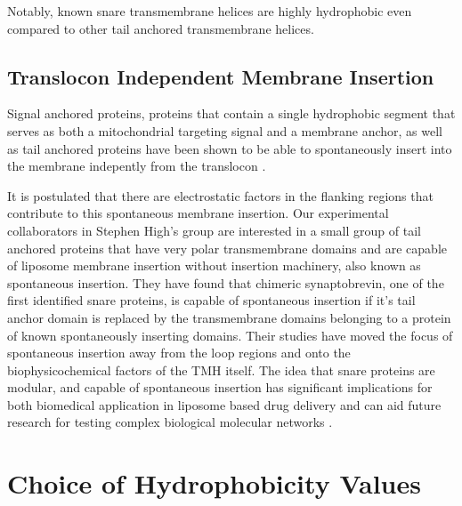Notably, known \gls{snare} transmembrane helices are highly hydrophobic even compared to other tail anchored transmembrane helices.

\subsection{Translocon Independent Membrane Insertion}
Signal anchored proteins, proteins that contain a single hydrophobic segment that serves as both a mitochondrial targeting signal and a membrane anchor, as well as tail anchored proteins have been shown to be able to spontaneously insert into the membrane indepently from the translocon \cite{Elisa2012, Lan2000, Colombo2009}.

It is postulated that there are electrostatic factors in the flanking regions that contribute to this spontaneous membrane insertion. Our experimental collaborators in Stephen High’s group are interested in a small group of tail anchored proteins that have very polar transmembrane domains and are capable of liposome membrane insertion without insertion machinery, also known as spontaneous insertion. They have found that chimeric synaptobrevin, one of the first identified \gls{snare} proteins, is capable of spontaneous insertion if it’s tail anchor domain is replaced by the transmembrane domains belonging to a protein of known spontaneously inserting domains. Their studies have moved the focus of spontaneous insertion away from the loop regions and onto the biophysicochemical factors of the TMH itself. The idea that \gls{snare} proteins are modular, and capable of spontaneous insertion has significant implications for both biomedical application in liposome based drug delivery and can aid future research for testing complex biological molecular networks \cite{Allen2013, Nordlund2014}.

\section{Choice of Hydrophobicity Values}
